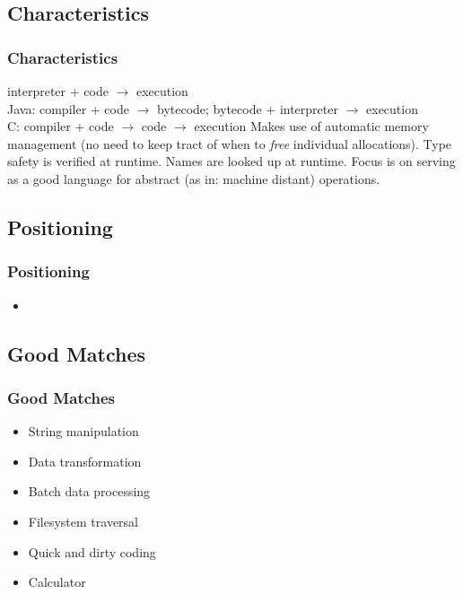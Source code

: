 \subsection{Characteristics}
\begin{frame}
    \frametitle{Characteristics}
    \vspace{5mm}
    
    \begin{itemize}
       interpreter + code $\rightarrow$ execution \\
        Java: compiler + code $\rightarrow$ bytecode; bytecode + interpreter $\rightarrow$ execution \\
        C: compiler + code $\rightarrow$ code $\rightarrow$ execution
       Makes use of automatic memory management (no need to keep tract of when to \textsl{free} individual allocations).
       Type safety is verified at runtime.
       Names are looked up at runtime.
       Focus is on serving as a good language for abstract (as in: machine distant) operations.
    \end{itemize}
\end{frame}

\subsection{Positioning}
\begin{frame}
    \frametitle{Positioning}
    \vspace{5mm}
    
    \begin{itemize}
      \item 
    \end{itemize}
\end{frame}

\subsection{Good Matches}
\begin{frame}
    \frametitle{Good Matches}
    \vspace{5mm}
    
    \begin{itemize}
      \item String manipulation
      \item Data transformation
      \item Batch data processing
      \item Filesystem traversal
      \item Quick and dirty coding
      \item Calculator
    \end{itemize}
\end{frame}

